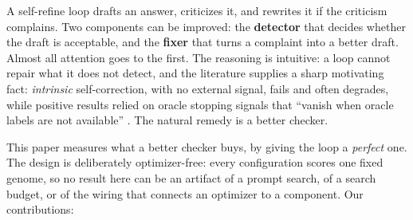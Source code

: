 \documentclass[11pt]{article}
\begin{document}
A self-refine loop \citep{madaan2023selfrefine} drafts an answer, criticizes it, and rewrites it if
the criticism complains. Two components can be improved: the \textbf{detector} that decides whether
the draft is acceptable, and the \textbf{fixer} that turns a complaint into a better draft. Almost
all attention goes to the first. The reasoning is intuitive: a loop cannot repair what it does
not detect, and the literature supplies a sharp motivating fact: \emph{intrinsic}
self-correction, with no external signal, fails and often degrades, while positive results relied
on oracle stopping signals that ``vanish when oracle labels are not available''
\citep{huang2023cannot}. The natural remedy is a better checker.

This paper measures what a better checker buys, by giving the loop a \emph{perfect} one.
The design is deliberately optimizer-free: every configuration scores one fixed genome, so no
result here can be an artifact of a prompt search, of a search budget, or of the wiring that
connects an optimizer to a component. Our contributions:
\end{document}
